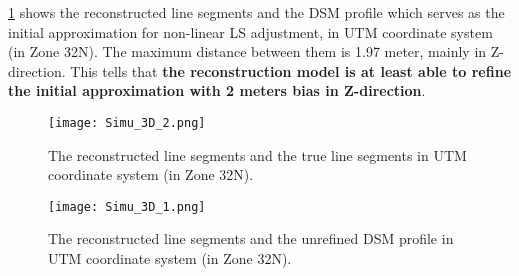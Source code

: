 \cref{fig:Simu3D_1} shows the reconstructed line segments and the DSM profile which serves as the initial approximation for non-linear LS adjustment, in UTM coordinate system (in Zone 32N). The maximum distance between them is 1.97 meter, mainly in Z-direction. This tells that \textbf{the reconstruction model is at least able to refine the initial approximation with 2 meters bias in Z-direction}.

\begin{figure}
  \centering
  \texttt{[image: Simu\_3D\_2.png]} %
  \caption{\small The reconstructed line segments and the true line segments in UTM coordinate system (in Zone 32N).}
  \label{fig:Simu3D_2}
  \vspace{1cm}
  \centering
  \texttt{[image: Simu\_3D\_1.png]}
  \caption{\small The reconstructed line segments and the unrefined DSM profile in UTM coordinate system (in Zone 32N).}
  \label{fig:Simu3D_1}
\end{figure}

\clearpage







